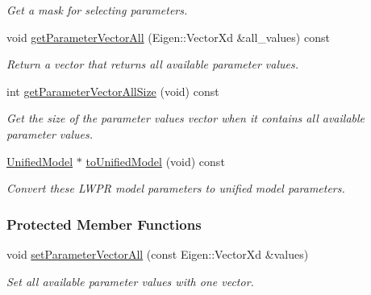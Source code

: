 \begin{DoxyCompactItemize}
\begin{DoxyCompactList}\small\item\em Get a mask for selecting parameters. \end{DoxyCompactList}\item 
void \hyperlink{classDmpBbo_1_1ModelParametersLWPR_a29429ff2771d1e56cfba7250d38da4b1}{get\+Parameter\+Vector\+All} (Eigen\+::\+Vector\+Xd \&all\+\_\+values) const 
\begin{DoxyCompactList}\small\item\em Return a vector that returns all available parameter values. \end{DoxyCompactList}\item 
int \hyperlink{classDmpBbo_1_1ModelParametersLWPR_ab24d2485b3b795b516f4844f225100eb}{get\+Parameter\+Vector\+All\+Size} (void) const 
\begin{DoxyCompactList}\small\item\em Get the size of the parameter values vector when it contains all available parameter values. \end{DoxyCompactList}\item 
\hyperlink{classDmpBbo_1_1UnifiedModel}{Unified\+Model} $\ast$ \hyperlink{classDmpBbo_1_1ModelParametersLWPR_a6e3534f93333334c2f0126f8fc4d29d1}{to\+Unified\+Model} (void) const 
\begin{DoxyCompactList}\small\item\em Convert these L\+W\+P\+R model parameters to unified model parameters. \end{DoxyCompactList}\end{DoxyCompactItemize}
\subsubsection*{Protected Member Functions}
\begin{DoxyCompactItemize}
\item 
void \hyperlink{classDmpBbo_1_1ModelParametersLWPR_a9d3c8f22e8237a805af4935a647e5a50}{set\+Parameter\+Vector\+All} (const Eigen\+::\+Vector\+Xd \&values)
\begin{DoxyCompactList}\small\item\em Set all available parameter values with one vector. \end{DoxyCompactList}\end{DoxyCompactItemize}
